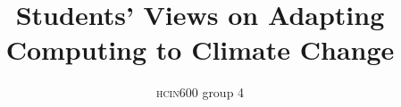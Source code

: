 \documentclass[sigconf]{acmart}
\begin{document}
\title{Students’ Views on Adapting Computing to Climate Change}

\author{\textsc{hcin}600 group 4}






\renewcommand{\shortauthors}{Group 4}

\begin{abstract}

\end{abstract}

\end{document}
